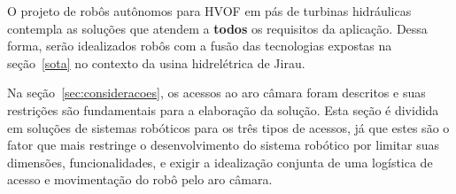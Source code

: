 O projeto de robôs autônomos para HVOF em pás de turbinas hidráulicas contempla
as soluções que atendem a \textbf{todos} os requisitos da aplicação. Dessa
forma, serão idealizados robôs com a fusão das tecnologias expostas na
seção~\ref{sota} no contexto da usina hidrelétrica de Jirau. 

Na seção~\ref{sec:consideracoes}, os acessos ao aro câmara foram
descritos e suas restrições são fundamentais para a elaboração da solução.
Esta seção é dividida em soluções de sistemas robóticos para os três tipos
de acessos, já que estes são o fator que mais restringe o desenvolvimento do
sistema robótico por limitar suas dimensões, funcionalidades, e exigir a
idealização conjunta de uma logística de acesso e movimentação do robô pelo aro
câmara.
